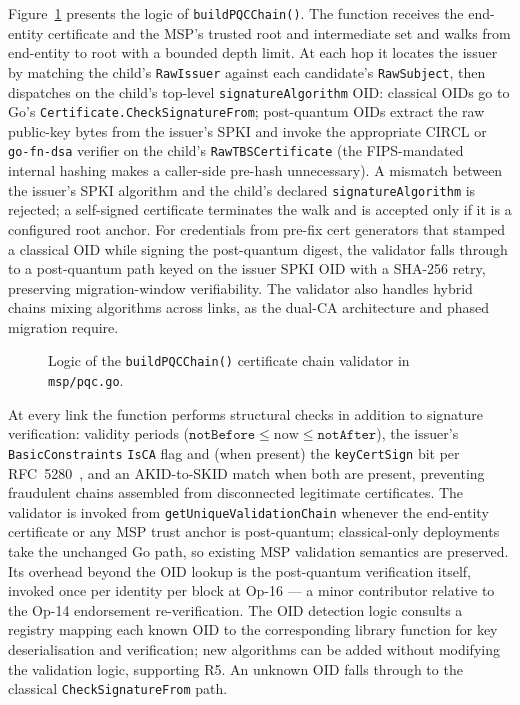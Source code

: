 \documentclass{ieeetj}
\begin{document}
Figure~\ref{fig:buildpqcchain_flowchart} presents the logic of
\texttt{buildPQCChain()}. The function receives the end-entity certificate and
the MSP's trusted root and intermediate set and walks from end-entity to root
with a bounded depth limit. At each hop it locates the issuer by matching the
child's \texttt{RawIssuer} against each candidate's \texttt{RawSubject}, then
dispatches on the child's top-level \texttt{signatureAlgorithm} OID: classical
OIDs go to Go's \texttt{Certificate.CheckSignatureFrom}; post-quantum OIDs
extract the raw public-key bytes from the issuer's SPKI and invoke the
appropriate CIRCL or \texttt{go-fn-dsa} verifier on the child's
\texttt{RawTBSCertificate} (the FIPS-mandated internal hashing makes a
caller-side pre-hash unnecessary). A mismatch between the issuer's SPKI algorithm
and the child's declared \texttt{signatureAlgorithm} is rejected; a self-signed
certificate terminates the walk and is accepted only if it is a configured root
anchor. For credentials from pre-fix cert generators that stamped a classical OID
while signing the post-quantum digest, the validator falls through to a
post-quantum path keyed on the issuer SPKI OID with a SHA-256 retry, preserving
migration-window verifiability. The validator also handles hybrid chains mixing
algorithms across links, as the dual-CA architecture and phased migration
require.

\begin{figure}[!t]
\centering

\caption{Logic of the \texttt{buildPQCChain()} certificate chain validator in \texttt{msp/pqc.go}.}
\label{fig:buildpqcchain_flowchart}
\end{figure}

At every link the function performs structural checks in addition to signature
verification: validity periods
($\texttt{notBefore}\le\text{now}\le\texttt{notAfter}$), the issuer's
\texttt{BasicConstraints} \texttt{IsCA} flag and (when present) the
\texttt{keyCertSign} bit per RFC~5280~\cite{rfc5280}, and an AKID-to-SKID match
when both are present, preventing fraudulent chains assembled from disconnected
legitimate certificates. The validator is invoked from
\texttt{getUniqueValidationChain} whenever the end-entity certificate or any MSP
trust anchor is post-quantum; classical-only deployments take the unchanged Go
path, so existing MSP validation semantics are preserved. Its overhead beyond
the OID lookup is the post-quantum verification itself, invoked once per identity
per block at Op-16 --- a minor contributor relative to the Op-14 endorsement
re-verification. The OID detection logic consults a registry mapping each known
OID to the corresponding library function for key deserialisation and
verification; new algorithms can be added without modifying the validation
logic, supporting R5. An unknown OID falls through to the classical
\texttt{CheckSignatureFrom} path.
\end{document}
